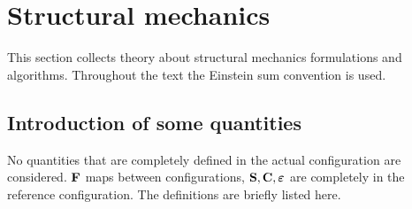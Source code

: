 \section{Structural mechanics}

This section collects theory about structural mechanics formulations and algorithms.
Throughout the text the Einstein sum convention is used.

\subsection{Introduction of some quantities}
No quantities that are completely defined in the actual configuration are considered. $\textbf{F}$ maps between configurations, $\textbf{S}, \textbf{C}, \boldsymbol{\varepsilon}$ are completely in the reference configuration.
The definitions are briefly listed here.
